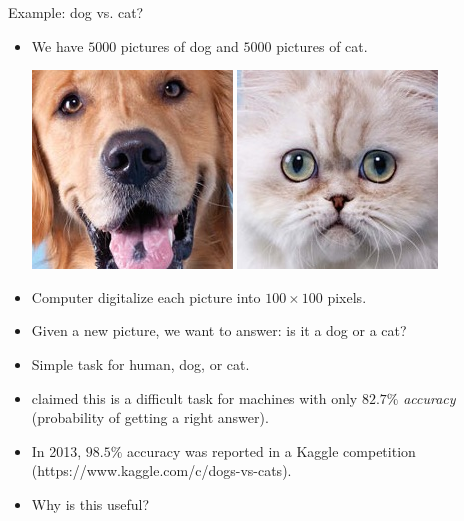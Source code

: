 \documentclass[first=purple,second=dgreen,logo=redexc]{aaltoslides}
\begin{document}
{\begin{frame}{Example: dog vs. cat?}
	\begin{itemize}
		\item We have $5000$ pictures of dog and $5000$ pictures of cat.
		\begin{center}
			\includegraphics[scale=0.3]{./figures/dog.jpg}
			\text{     }
			\includegraphics[scale=0.3]{./figures/cat.jpg}
		\end{center}
		\item Computer digitalize each picture into $100\times100$ pixels.
		\item Given a new picture, we want to answer: is it a dog or a cat?
		\item Simple task for human, dog, or cat.
		\item \citet{Golle08machine} claimed this is a difficult task for machines with only $82.7\%$ \textit{accuracy} (probability of getting a right answer).
		\item In 2013, $98.5\%$ accuracy was reported in a Kaggle competition (https://www.kaggle.com/c/dogs-vs-cats).
		\item Why is this useful?
	\end{itemize}
\end{frame}

}
\end{document}
